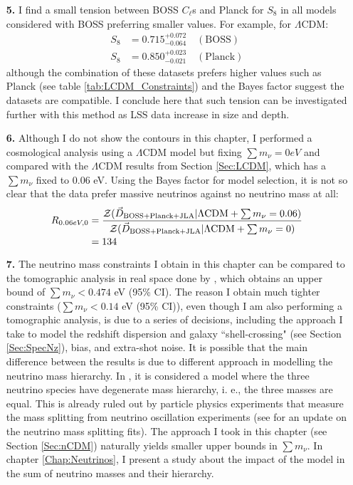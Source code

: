\begin{itemize}
\item[\textbf{5.}] I find a small tension between BOSS $C_{\ell}$s and Planck for $S_8$ in all models considered with BOSS preferring smaller values. For example, for $\Lambda$CDM: 
\begin{align*}
S_8 & = 0.715^{+0.072}_{-0.064} \quad(\text{BOSS}) \\ \nonumber
S_8 &  = 0.850^{+0.023}_{-0.021}\quad(\text{Planck}) \nonumber
\end{align*}
although the combination of these datasets prefers higher values such as Planck (see table \ref{tab:LCDM_Constraints}) and the Bayes factor suggest the datasets are compatible. I conclude here that such tension can be investigated further with this method as LSS data increase in size and depth.

\item[\textbf{6.}] Although I do not show the contours in this chapter, I performed a cosmological analysis using a $\Lambda$CDM model but fixing $\sum m_{\nu} = 0 eV$ and compared with the $\Lambda$CDM results from Section \ref{Sec:LCDM}, which has a $\sum m_{\nu}$ fixed to $0.06$ eV. Using the Bayes factor for model selection, it is not so clear that the data prefer massive neutrinos against no neutrino mass at all:
\begin{align}
R_{0.06 eV, 0} & = \frac{\mathcal{Z}(\vec{D}_{\tiny\text{BOSS+Planck+JLA}}| \Lambda\text{CDM} + \sum m_{\nu} = 0.06)}{\mathcal{Z}(\vec{D}_{\tiny\text{BOSS+Planck+JLA}}| \Lambda\text{CDM} + \sum m_{\nu} = 0)} \nonumber \\
& = 134 \nonumber
\end{align}

\item[\textbf{7.}] The neutrino mass constraints I obtain in this chapter can be compared to the tomographic analysis in real space done by \cite{2017SalazarBOSSwTheta}, which obtains an upper bound of $\sum m_{\nu} < 0.474$ eV (95\% CI). The reason I obtain much tighter constraints ($\sum m_{\nu} < 0.14$ eV (95\% CI)), even though I am also performing a tomographic analysis, is due to a series of decisions, including the approach I take to model the redshift dispersion and galaxy ``shell-crossing" (see Section \ref{Sec:SpecNz}), bias, and extra-shot noise. It is possible that the main difference between the results is due to different approach in modelling the neutrino mass hierarchy. In \cite{2017SalazarBOSSwTheta}, it is considered a model where the three neutrino species have degenerate mass hierarchy, i. e., the three masses are equal. This is already ruled out by particle physics experiments that measure the mass splitting from neutrino oscillation experiments (see \citealt{2014Gonzalez-GarciaNeutrino} for an update on the neutrino mass splitting fits). The approach I took in this chapter (see Section \ref{Sec:nCDM}) naturally yields smaller upper bounds in $\sum m_{\nu}$. In chapter \ref{Chap:Neutrinos}, I present a study about the impact of the model in the sum of neutrino masses and their hierarchy.

\end{itemize}


